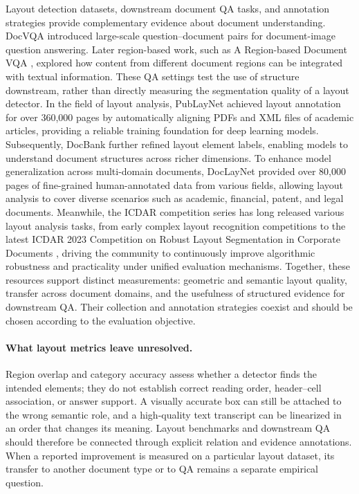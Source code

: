 Layout detection datasets, downstream document QA tasks, and annotation strategies provide complementary evidence about document understanding. DocVQA \cite{mathew2020docvqa} introduced large-scale question--document pairs for document-image question answering. Later region-based work, such as A Region-based Document VQA \cite{jiang2022regionbased}, explored how content from different document regions can be integrated with textual information. These QA settings test the use of structure downstream, rather than directly measuring the segmentation quality of a layout detector. In the field of layout analysis, PubLayNet \cite{zhong2019publaynet} achieved layout annotation for over 360,000 pages by automatically aligning PDFs and XML files of academic articles, providing a reliable training foundation for deep learning models. Subsequently, DocBank \cite{li2020docbank} further refined layout element labels, enabling models to understand document structures across richer dimensions. To enhance model generalization across multi-domain documents, DocLayNet \cite{pfitzmann2022doclaynet} provided over 80,000 pages of fine-grained human-annotated data from various fields, allowing layout analysis to cover diverse scenarios such as academic, financial, patent, and legal documents. Meanwhile, the ICDAR competition series has long released various layout analysis tasks, from early complex layout recognition competitions to the latest ICDAR 2023 Competition on Robust Layout Segmentation in Corporate Documents \cite{auer2023icdar23}, driving the community to continuously improve algorithmic robustness and practicality under unified evaluation mechanisms. Together, these resources support distinct measurements: geometric and semantic layout quality, transfer across document domains, and the usefulness of structured evidence for downstream QA. Their collection and annotation strategies coexist and should be chosen according to the evaluation objective.

\paragraph{What layout metrics leave unresolved.}
Region overlap and category accuracy assess whether a detector finds the intended elements; they do not establish correct reading order, header--cell association, or answer support. A visually accurate box can still be attached to the wrong semantic role, and a high-quality text transcript can be linearized in an order that changes its meaning. Layout benchmarks and downstream QA should therefore be connected through explicit relation and evidence annotations. When a reported improvement is measured on a particular layout dataset, its transfer to another document type or to QA remains a separate empirical question.


